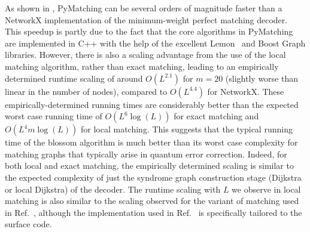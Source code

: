\documentclass{article}
\begin{document}
As shown in , PyMatching can be several orders of magnitude faster than a NetworkX implementation of the minimum-weight perfect matching decoder.
This speedup is partly due to the fact that the core algorithms in PyMatching are implemented in C++ with the help of the excellent Lemon~\cite{dezsHo2011lemon} and Boost Graph libraries.
However, there is also a scaling advantage from the use of the local matching algorithm, rather than exact matching, leading to an empirically determined runtime scaling of around $O(L^{2.1})$ for $m=20$ (slightly worse than linear in the number of nodes), compared to $O(L^{4.4})$ for NetworkX.
These empirically-determined running times are considerably better than the expected worst case running time of $O(L^6\log(L))$ for exact matching and $O(L^4m\log(L))$ for local matching.
This suggests that the typical running time of the blossom algorithm is much better than its worst case complexity for matching graphs that typically arise in quantum error correction.
Indeed, for both local and exact matching, the empirically determined scaling is similar to the expected complexity of just the syndrome graph construction stage (Dijkstra or local Dijkstra) of the decoder.
The runtime scaling with $L$ we observe in local matching is also similar to the scaling observed for the variant of matching used in Ref.~\cite{fowler2012towardstiming}, although the implementation used in Ref.~\cite{fowler2012towardstiming} is specifically tailored to the surface code.
\end{document}
